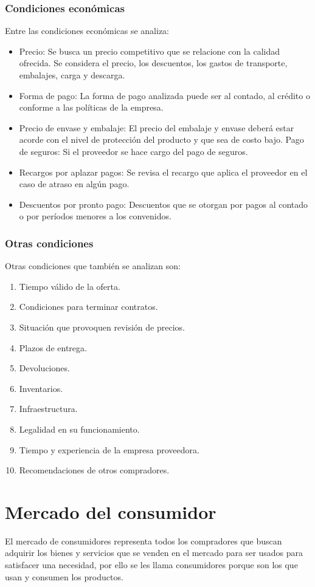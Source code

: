 \documentclass[../main]{subfiles}
\begin{document}
\subsubsection{Condiciones económicas}
Entre las condiciones económicas se analiza:
\begin{itemize}
  \item Precio: Se busca un precio competitivo que se relacione con la
    calidad ofrecida. Se considera el precio, los descuentos, los
    gastos de transporte, embalajes, carga y descarga.
  \item Forma de pago: La forma de pago analizada puede ser al
    contado, al crédito o conforme a las políticas de la empresa.
  \item Precio de envase y embalaje: El precio del embalaje y envase
    deberá estar acorde con el nivel de protección del producto y que
    sea de costo bajo.
    Pago de seguros: Si el proveedor se hace cargo del pago de seguros.
  \item Recargos por aplazar pagos: Se revisa el recargo que aplica
    el proveedor en el caso de atraso en algún pago.
  \item Descuentos por pronto pago: Descuentos que se otorgan por
    pagos al contado o por períodos menores a los convenidos.
\end{itemize}
\subsubsection{Otras condiciones}
Otras condiciones que también se analizan son:
\begin{enumerate}
  \item Tiempo válido de la oferta.
  \item Condiciones para terminar contratos.
  \item Situación que provoquen revisión de precios.
  \item Plazos de entrega.
  \item Devoluciones.
  \item Inventarios.
  \item Infraestructura.
  \item Legalidad en su funcionamiento.
  \item Tiempo y experiencia de la empresa proveedora.
  \item Recomendaciones de otros compradores.
\end{enumerate}
\section{Mercado del consumidor}
El mercado de consumidores representa todos los compradores que
buscan adquirir los bienes y servicios que se venden en el mercado
para ser usados para satisfacer una necesidad, por ello se les llama
consumidores porque son los que usan y consumen los productos.
\end{document}
